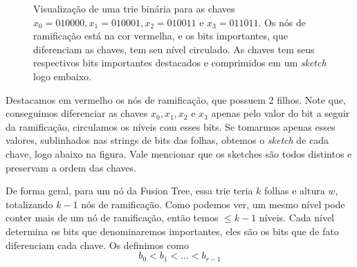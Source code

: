 \begin{figure}[h!]
\caption{Visualização de uma trie binária para as chaves
$x_0=010000,x_1=010001,x_2=010011$ e $x_3=011011$. Os nós de ramificação está na
cor vermelha, e os bits importantes, que diferenciam as chaves, tem seu nível
circulado. As chaves tem seus respectivos bits importantes destacados e
comprimidos em um \textit{sketch} logo embaixo.\label{f:fusion-trie}}
\end{figure}

Destacamos em vermelho os nós de ramificação, que possuem 2 filhos. Note que,
conseguimos diferenciar as chaves $x_0,x_1,x_2$ e $x_3$ apenas pelo valor do bit
a seguir da ramificação, circulamos os níveis com esses bits. Se tomarmos apenas
esses valores, sublinhados nas strings de bits das folhas, obtemos o
\textit{sketch} de cada chave, logo abaixo na figura. Vale mencionar que os
sketches são todos distintos e preservam a ordem das chaves.

De forma geral, para um nó da Fusion Tree, essa trie teria $k$ folhas e altura
$w$, totalizando $k-1$ nós de ramificação. Como podemos ver, um mesmo nível pode
conter mais de um nó de ramificação, então temos $\leq k-1$ níveis. Cada nível
determina os bits que denominaremos importantes, eles são os bits que de fato
diferenciam cada chave. Os definimos como
\[
b_0<b_1<\dots <b_{r-1}
\]

